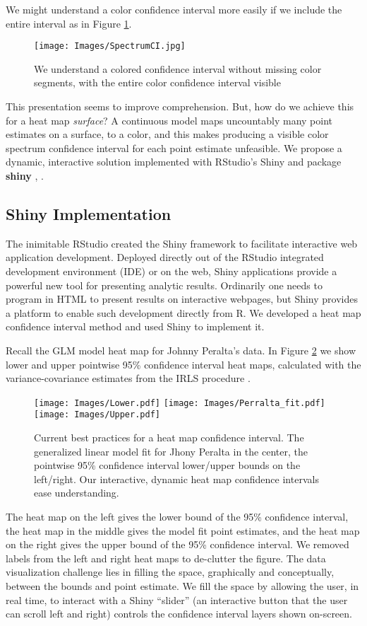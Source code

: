 We might understand a color confidence interval more easily if we include the entire interval as in Figure \ref{fig:specint}.
  \begin{figure}[H]
  \centering
	\texttt{[image: Images/SpectrumCI.jpg]}
	\caption{We understand a colored confidence interval without missing color segments, with the entire color confidence interval visible}
	\label{fig:specint}
	\end{figure}
This presentation seems to improve comprehension. But, how do we achieve this for a heat map {\it surface}? A continuous model maps uncountably many point estimates on a surface, to a color, and this makes producing a visible color spectrum confidence interval for each point estimate unfeasible. We propose a dynamic, interactive solution implemented with RStudio's Shiny and package {\bf shiny} \citep{Shiny}, \citep{RStudio}.

\subsection{Shiny Implementation}
The inimitable RStudio created the Shiny framework to facilitate interactive web application development. Deployed directly out of the RStudio integrated development environment (IDE) \citep{IDE} or on the web, Shiny applications provide a powerful new tool for presenting analytic results. Ordinarily one needs to program in HTML to present results on interactive webpages, but Shiny provides a platform to enable such development directly from R. We developed a heat map confidence interval method and used Shiny to implement it.

Recall the GLM model heat map for Johnny Peralta's data. In Figure \ref{fig:LPU} we show lower and upper pointwise 95\% confidence interval heat maps, calculated with the variance-covariance estimates from the IRLS procedure \citep{Myers2012}.
  \begin{figure}[H]
	\centering
	\texttt{[image: Images/Lower.pdf]}
	\texttt{[image: Images/Perralta\_fit.pdf]}
	\texttt{[image: Images/Upper.pdf]}
	\caption{Current best practices for a heat map confidence interval. The generalized linear model fit for Jhony Peralta in the center, the pointwise 95\% confidence interval lower/upper bounds on the left/right. Our interactive, dynamic heat map confidence intervals ease understanding.}
	\label{fig:LPU}
	\end{figure}
The heat map on the left gives the lower bound of the 95\% confidence interval, the heat map in the middle gives the model fit point estimates, and the heat map on the right gives the upper bound of the 95\% confidence interval. We removed labels from the left and right heat maps to de-clutter the figure. The data visualization challenge lies in filling the space, graphically and conceptually, between the bounds and point estimate. We fill the space by allowing the user, in real time, to interact with a Shiny ``slider'' (an interactive button that the user can scroll left and right) controls the confidence interval layers shown on-screen. 

